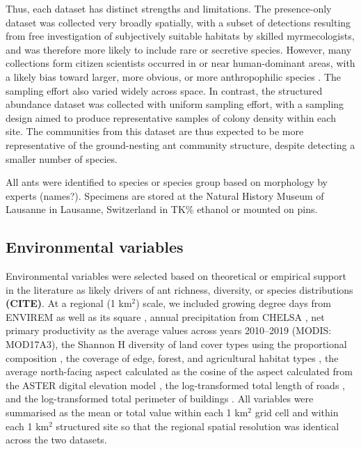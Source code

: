\documentclass[preprint,review,times,12pt]{elsarticle}
\begin{document}
Thus, each dataset has distinct strengths and limitations. The presence-only dataset was collected very broadly spatially, with a subset of detections resulting from free investigation of subjectively suitable habitats by skilled myrmecologists, and was therefore more likely to include rare or secretive species. However, many collections form citizen scientists occurred in or near human-dominant areas, with a likely bias toward larger, more obvious, or more anthropophilic species \citep{Ward2014, Troudet2017}. The sampling effort also varied widely across space. In contrast, the structured abundance dataset was collected with uniform sampling effort, with a sampling design aimed to produce representative samples of colony density within each site. The communities from this dataset are thus expected to be more representative of the ground-nesting ant community structure, despite detecting a smaller number of species. 

All ants were identified to species or species group based on morphology by experts (names?). Specimens are stored at the Natural History Museum of Lausanne in Lausanne, Switzerland in TK\% ethanol or mounted on pins. 


\subsection{Environmental variables}
Environmental variables were selected based on theoretical or empirical support in the literature as likely drivers of ant richness, diversity, or species distributions \citep{Szewczyk2018} \textbf{(CITE)}. At a regional (1 km$^2$) scale, we included growing degree days from ENVIREM as well as its square \citep{Title2018}, annual precipitation from CHELSA \citep{Karger2017}, net primary productivity as the average values across years 2010–2019 (MODIS: MOD17A3), the Shannon H diversity of land cover types using the proportional composition \citep{Gago-Silva2017}, the coverage of edge, forest, and agricultural habitat types \citep{Gago-Silva2017}, the average north-facing aspect calculated as the cosine of the aspect calculated from the ASTER digital elevation model \citep{Tachikawa2011}, the log-transformed total length of roads \citep{OpenStreetMap}, and the log-transformed total perimeter of buildings \citep{OpenStreetMap}. All variables were summarised as the mean or total value within each 1 km$^2$ grid cell and within each 1 km$^2$ structured site so that the regional spatial resolution was identical across the two datasets.
\end{document}
